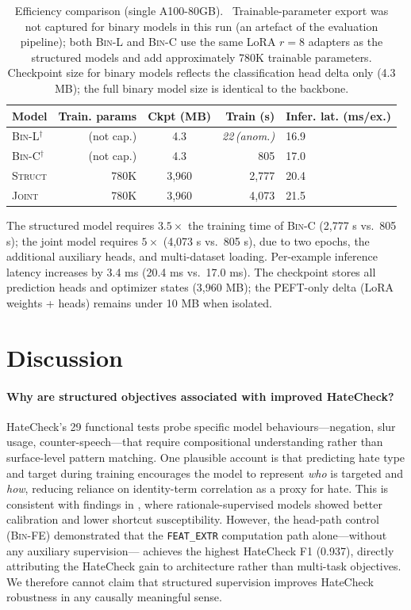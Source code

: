 \documentclass{article}
\begin{document}
\begin{table}[t]
\centering
\caption{Efficiency comparison (single A100-80GB).
\dag~Trainable-parameter export was not captured for binary models in this
run (an artefact of the evaluation pipeline); both \textsc{Bin-L} and
\textsc{Bin-C} use the same LoRA $r=8$ adapters as the structured models
and add approximately 780K trainable parameters.
Checkpoint size for binary models reflects the classification head delta only
(4.3 MB); the full binary model size is identical to the backbone.}
\label{tab:efficiency}
\small
\begin{tabular}{lrcrl}
\toprule
Model & Train. params & Ckpt (MB) & Train (s) & Infer. lat. (ms/ex.) \\
\midrule
\textsc{Bin-L}$^\dag$ & {\small(not cap.)} & 4.3 & \textit{22\,(anom.)} & 16.9 \\
\textsc{Bin-C}$^\dag$ & {\small(not cap.)} & 4.3 & 805 & 17.0 \\
\textsc{Struct} & 780K & 3,960 & 2,777 & 20.4 \\
\textsc{Joint} & 780K & 3,960 & 4,073 & 21.5 \\
\bottomrule
\end{tabular}
\end{table}

The structured model requires $3.5\times$ the training time of \textsc{Bin-C}
(2,777 s vs.\ 805 s); the joint model requires $5\times$ (4,073 s vs.\ 805 s),
due to two epochs, the additional auxiliary heads, and multi-dataset loading.
Per-example inference latency increases by 3.4 ms (20.4 ms vs.\ 17.0 ms).
The checkpoint stores all prediction heads and optimizer states (3,960 MB); the
PEFT-only delta (LoRA weights + heads) remains under 10 MB when isolated.

\section{Discussion}
\label{sec:discussion}

\paragraph{Why are structured objectives associated with improved HateCheck?}
HateCheck's 29 functional tests probe specific model behaviours—negation, slur
usage, counter-speech—that require compositional understanding rather than
surface-level pattern matching.
One plausible account is that predicting hate type and target during training
encourages the model to represent \emph{who} is targeted and \emph{how},
reducing reliance on identity-term correlation as a proxy for hate.
This is consistent with findings in \citet{mathew2021hatexplain}, where
rationale-supervised models showed better calibration and lower shortcut
susceptibility.
However, the head-path control (\textsc{Bin-FE}) demonstrated that the
\texttt{FEAT\_EXTR} computation path alone—without any auxiliary supervision—
achieves the highest HateCheck F1 (0.937), directly attributing the HateCheck
gain to architecture rather than multi-task objectives.
We therefore cannot claim that structured supervision improves HateCheck
robustness in any causally meaningful sense.
\end{document}
